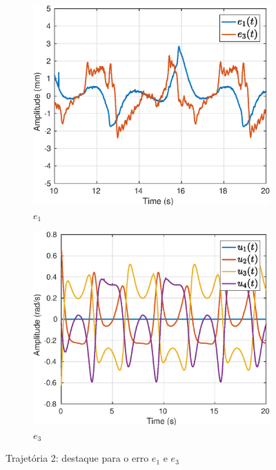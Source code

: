 \begin{figure}[H]
\centering
\begin{subfigure}{.5\textwidth}
  \centering
  \includegraphics[width=\linewidth]{./img/traj_2_k5/error.eps}
  \caption{$e_1$}
  \label{fig:sub1}
\end{subfigure}%
\begin{subfigure}{.5\textwidth}
  \centering
  \includegraphics[width=\linewidth]{./img/traj_2_k5/u.eps}
  \caption{$e_3$}
  \label{fig:sub2}
\end{subfigure}
\caption{Trajetória 2: destaque para o erro $e_1$ e $e_3$}
\label{fig:erro_traj}
\end{figure}

